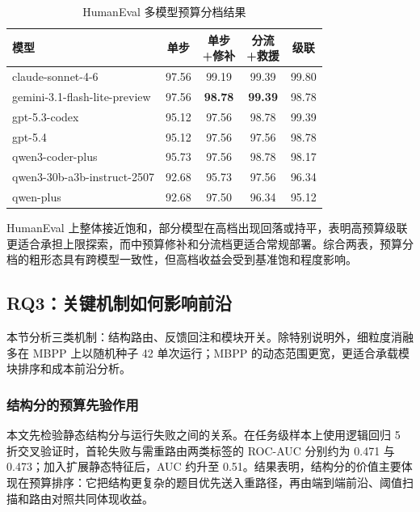 \begin{table}[H]
\centering
\scriptsize
\caption{HumanEval 多模型预算分档结果}
\label{tab:model_results_he}
\begin{tabularx}{\linewidth}{>{\raggedright\arraybackslash}X c c c c}
\toprule
模型 & 单步 & \makecell{单步\\+修补} & \makecell{分流\\+救援} & 级联 \\
\midrule
claude-sonnet-4-6 & 97.56 & 99.19 & 99.39 & 99.80 \\
gemini-3.1-flash-lite-preview & 97.56 & \textbf{98.78} & \textbf{99.39} & 98.78 \\
gpt-5.3-codex & 95.12 & 97.56 & 98.78 & 99.39 \\
gpt-5.4 & 95.12 & 97.56 & 97.56 & 98.78 \\
qwen3-coder-plus & 95.73 & 97.56 & 98.78 & 98.17 \\
qwen3-30b-a3b-instruct-2507 & 92.68 & 95.73 & 97.56 & 96.34 \\
qwen-plus & 92.68 & 97.50 & 96.34 & 95.12 \\
\bottomrule
\end{tabularx}
\end{table}

HumanEval 上整体接近饱和，部分模型在高档出现回落或持平，表明高预算级联更适合承担上限探索，而中预算修补和分流档更适合常规部署。综合两表，预算分档的粗形态具有跨模型一致性，但高档收益会受到基准饱和程度影响。

\subsection{RQ3：关键机制如何影响前沿}
\label{sec:mechverify}

本节分析三类机制：结构路由、反馈回注和模块开关。除特别说明外，细粒度消融多在 MBPP 上以随机种子 42 单次运行；MBPP 的动态范围更宽，更适合承载模块排序和成本前沿分析。

\subsubsection{结构分的预算先验作用}

本文先检验静态结构分与运行失败之间的关系。在任务级样本上使用逻辑回归 5 折交叉验证时，首轮失败与需重路由两类标签的 ROC-AUC 分别约为 0.471 与 0.473；加入扩展静态特征后，AUC 约升至 0.51。结果表明，结构分的价值主要体现在预算排序：它把结构更复杂的题目优先送入重路径，再由端到端前沿、阈值扫描和路由对照共同体现收益。

